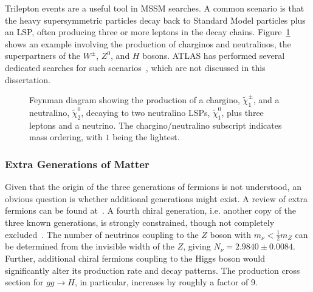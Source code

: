 Trilepton events are a useful tool in MSSM searches. A common scenario is that the heavy supersymmetric particles decay back to Standard Model particles plus an LSP, often producing three or more leptons in the decay chains. Figure~\ref{fig:theory-susy-trilepton-example} shows an example involving the production of charginos and neutralinos, the superpartners of the $W^{\pm}$, $Z^0$, and $H$ bosons. ATLAS has performed several dedicated searches for such scenarios~\cite{TheATLASCollaboration:2014cs,Aad:2014ia,TheATLASCollaboration:2014hq}, which are not discussed in this dissertation. 

\begin{figure}[htbp]
	\centering
	\caption{Feynman diagram showing the production of a chargino, $\tilde{\chi}_1^{\pm}$, and a neutralino, $\tilde{\chi}^0_2$, decaying to two neutralino LSPs, $\tilde{\chi}^0_1$, plus three leptons and a neutrino. The chargino/neutralino subscript indicates mass ordering, with $1$ being the lightest.}
	\label{fig:theory-susy-trilepton-example}
\end{figure}



\subsubsection{Extra Generations of Matter}
Given that the origin of the three generations of fermions is not understood, an obvious question is whether additional generations might exist. A review of extra fermions can be found at~\cite{Frampton:1999kr}. A fourth chiral generation, i.e. another copy of the three known generations, is strongly constrained, though not completely excluded~\cite{Buchkremer:2012gb,Djouadi:2012dm,Chanowitz:2013hk,Banerjee:2014gy}. The number of neutrinos coupling to the $Z$ boson with $m_{\nu}<\frac12 m_Z$ can be determined from the invisible width of the $Z$, giving $N_{\nu}= 2.9840 \pm 0.0084$. Further, additional chiral fermions coupling to the Higgs boson would significantly alter its production rate and decay patterns. The production cross section for $gg\rightarrow H$, in particular, increases by roughly a factor of 9. 

